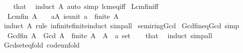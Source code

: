 \begin{isabellebody}
%
\isadelimproof
\ \ %
\endisadelimproof
%
\isatagproof
{}\isamarkupfalse%
\ that\ \isamarkupfalse%
\ {\isacharparenleft}{\kern0pt}induct\ A{\isacharparenright}{\kern0pt}\ {\isacharparenleft}{\kern0pt}auto\ simp{\isacharcolon}{\kern0pt}\ lcm{\isacharunderscore}{\kern0pt}eq{\isacharunderscore}{\kern0pt}{}{\isacharunderscore}{\kern0pt}iff{\isacharparenright}{\kern0pt}%
\endisatagproof
{\isafoldproof}%
%
\isadelimproof
\isanewline
%
\endisadelimproof
\isanewline
{}\isamarkupfalse%
\ Lcm{\isacharunderscore}{\kern0pt}fin{\isacharunderscore}{\kern0pt}{}{\isacharunderscore}{\kern0pt}iff{\isacharcolon}{\kern0pt}\isanewline
\ \ {\isachardoublequoteopen}Lcm\isactrlsub f\isactrlsub i\isactrlsub n\ A\ {\isacharequal}{\kern0pt}\ {}\ {\isasymlongleftrightarrow}\ {\isacharparenleft}{\kern0pt}{\isasymforall}a{\isasymin}A{\isachardot}{\kern0pt}\ is{\isacharunderscore}{\kern0pt}unit\ a{\isacharparenright}{\kern0pt}\ {\isasymand}\ finite\ A{\isachardoublequoteclose}\isanewline
%
\isadelimproof
\ \ %
\endisadelimproof
%
\isatagproof
{}\isamarkupfalse%
\ {\isacharparenleft}{\kern0pt}induct\ A\ rule{\isacharcolon}{\kern0pt}\ infinite{\isacharunderscore}{\kern0pt}finite{\isacharunderscore}{\kern0pt}induct{\isacharparenright}{\kern0pt}\ simp{\isacharunderscore}{\kern0pt}all%
\endisatagproof
{\isafoldproof}%
%
\isadelimproof
\isanewline
%
\endisadelimproof
\isanewline
{}\isamarkupfalse%
\isanewline
\isanewline
{}\isamarkupfalse%
\ semiring{\isacharunderscore}{\kern0pt}Gcd\isanewline
{}\isanewline
\isanewline
{}\isamarkupfalse%
\ Gcd{\isacharunderscore}{\kern0pt}fin{\isacharunderscore}{\kern0pt}eq{\isacharunderscore}{\kern0pt}Gcd\ {\isacharbrackleft}{\kern0pt}simp{\isacharbrackright}{\kern0pt}{\isacharcolon}{\kern0pt}\isanewline
\ \ {\isachardoublequoteopen}Gcd\isactrlsub f\isactrlsub i\isactrlsub n\ A\ {\isacharequal}{\kern0pt}\ Gcd\ A{\isachardoublequoteclose}\ \ {\isachardoublequoteopen}finite\ A{\isachardoublequoteclose}\ \ A\ {\isacharcolon}{\kern0pt}{\isacharcolon}{\kern0pt}\ {\isachardoublequoteopen}{\isacharprime}{\kern0pt}a\ set{\isachardoublequoteclose}\isanewline
%
\isadelimproof
\ \ %
\endisadelimproof
%
\isatagproof
{}\isamarkupfalse%
\ that\ \isamarkupfalse%
\ induct\ simp{\isacharunderscore}{\kern0pt}all%
\endisatagproof
{\isafoldproof}%
%
\isadelimproof
\isanewline
%
\endisadelimproof
\isanewline
{}\isamarkupfalse%
\ Gcd{\isacharunderscore}{\kern0pt}set{\isacharunderscore}{\kern0pt}eq{\isacharunderscore}{\kern0pt}fold\ {\isacharbrackleft}{\kern0pt}code{\isacharunderscore}{\kern0pt}unfold{\isacharbrackright}{\kern0pt}{\isacharcolon}{\kern0pt}\isanewline

\end{isabellebody}
